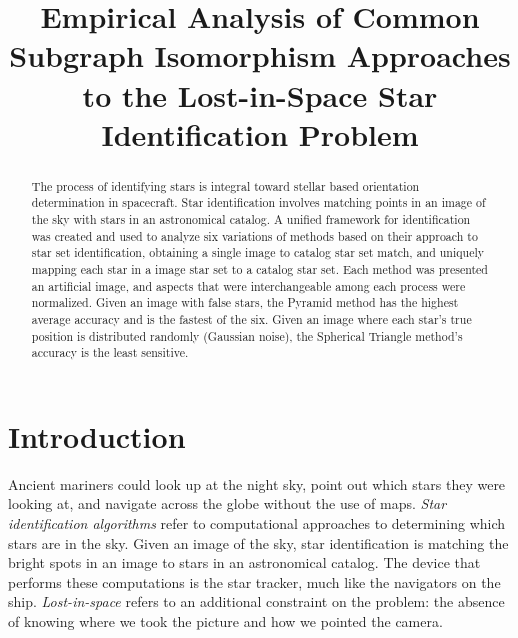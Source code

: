 \documentclass[conference]{IEEEtran}
\begin{document}
    \title{Empirical Analysis of Common Subgraph Isomorphism Approaches to the Lost-in-Space Star
    Identification Problem}

    \author{
    \and
    }

    \maketitle

%    

    \begin{abstract}
        The process of identifying stars is integral toward stellar based orientation determination in spacecraft.
        Star identification involves matching points in an image of the sky with stars in an astronomical catalog.
        A unified framework for identification was created and used to analyze six variations of methods based on their
        approach to star set identification, obtaining a single image to catalog star set match, and uniquely mapping
        each star in a image star set to a catalog star set.
        Each method was presented an artificial image, and aspects that were interchangeable among each process were
        normalized.
        Given an image with false stars, the Pyramid method has the highest average accuracy and is the fastest of the six.
        Given an image where each star's true position is distributed randomly (Gaussian noise), the Spherical Triangle
        method's accuracy is the least sensitive.
    \end{abstract}

    \section{Introduction}\label{sec:introduction}
    Ancient mariners could look up at the night sky, point out which stars they were looking at, and navigate across the
    globe without the use of maps.
    \textit{Star identification algorithms} refer to computational approaches to determining which stars are in the sky.
    Given an image of the sky, star identification is matching the bright spots in an image to stars in an astronomical
    catalog.
    The device that performs these computations is the star tracker, much like the navigators on the ship.
    \textit{Lost-in-space} refers to an additional constraint on the problem: the absence of knowing where we took
    the picture and how we pointed the camera.
\end{document}
